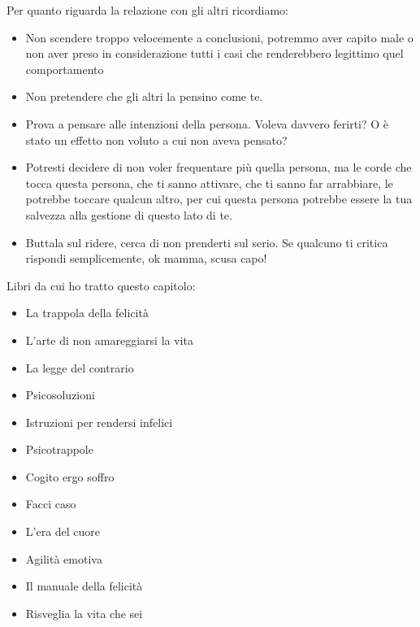 \documentclass[12pt]{book} %
\begin{document}
Per quanto riguarda la relazione con gli altri ricordiamo:
\begin{itemize}
\item Non scendere troppo velocemente a conclusioni, potremmo aver capito male o non aver preso in considerazione tutti
i casi che renderebbero legittimo quel comportamento
\item Non pretendere che gli altri la pensino come te.
\item Prova a pensare alle intenzioni della persona. Voleva davvero ferirti? O è stato un effetto non voluto a cui non
aveva pensato?
\item Potresti decidere di non voler frequentare più quella persona, ma le corde che tocca questa persona,
che ti sanno attivare, che ti sanno far arrabbiare, le potrebbe toccare qualcun altro, per cui questa persona potrebbe
essere la tua salvezza alla gestione di questo lato di te.
\item Buttala sul ridere, cerca di non prenderti sul serio. Se qualcuno ti critica rispondi semplicemente, ok mamma, scusa capo!
\end{itemize}

Libri da cui ho tratto questo capitolo:

\begin{itemize}
\item La trappola della felicità
\item L'arte di non amareggiarsi la vita
\item La legge del contrario
\item Psicosoluzioni 
\item Istruzioni per rendersi infelici
\item Psicotrappole
\item Cogito ergo soffro
\item Facci caso
\item L'era del cuore
\item Agilità emotiva
\item Il manuale della felicità
\item Risveglia la vita che sei
\end{itemize}
\end{document}
